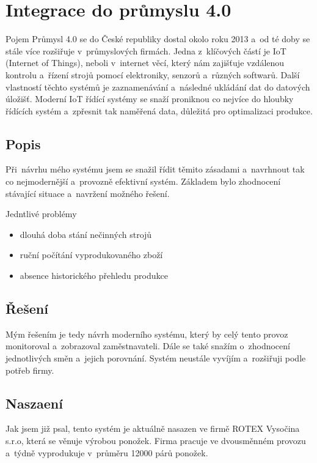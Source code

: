\chapter{Integrace do průmyslu 4.0}
Pojem Průmysl 4.0 se do České republiky dostal okolo roku 2013 a~od té doby se stále více rozšiřuje v~průmyslových firmách.
Jedna z~klíčových částí je IoT (Internet of Things), neboli v~internet věcí, který nám zajišťuje vzdálenou kontrolu a~řízení strojů pomocí elektroniky, senzorů a~různých softwarů.
Další vlastností těchto systémů je zaznamenávání a~následné ukládání dat do datových úložišť.
Moderní IoT řídící systémy se snaží proniknou co nejvíce do hloubky řídících systém a~zpřesnit tak naměřená data, důležitá pro optimalizaci produkce.   

\section{Popis}
Při~návrhu mého systému jsem se snažil řídit těmito zásadami a~navrhnout tak co nejmodernější a~provozně efektivní systém.
Základem bylo zhodnocení stávající situace a~navržení možného řešení.

Jedntlivé problémy
\begin{itemize}
    \item dlouhá doba stání nečinných strojů
    \item ruční počítání vyprodukovaného zboží
    \item absence historického přehledu produkce
\end{itemize}

\section{Řešení}
Mým řešením je tedy návrh moderního systému, který by celý tento provoz monitoroval a~zobrazoval zaměstnavateli.
Dále se také snažím o~zhodnocení jednotlivých směn a~jejich porovnání.
Systém neustále vyvíjím a~rozšiřuji podle potřeb firmy.

\section{Naszaení}
Jak jsem již psal, tento systém je aktuálně nasazen ve firmě ROTEX Vysočina s.r.o\cite{ROTEX}, která se věnuje výrobou ponožek. 
Firma pracuje ve dvousměnném provozu a~týdně vyprodukuje v~průměru 12000 párů ponožek. 

